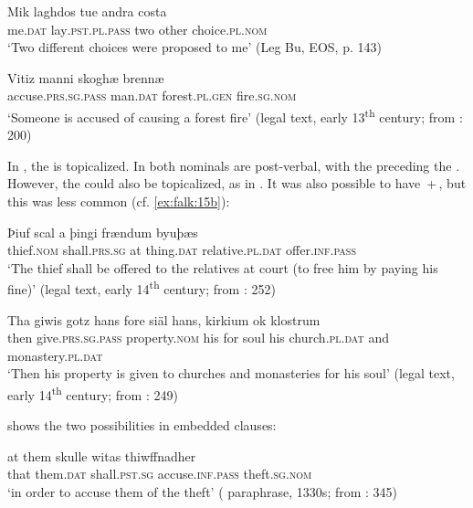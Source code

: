 \documentclass[output=paper]{langscibook}
\begin{document}
\ea%
    \label{ex:falk:14}
\ea \label{ex:falk:14a}
\gll Mik    laghdos        tue  andra  costa\\
      me\textsc{.dat}  lay\textsc{.pst.pl.pass}  two  other    choice\textsc{.pl.nom}\\
\glt ‘Two different choices were proposed to me’ (Leg Bu, EOS, p. 143)

\ex \label{ex:falk:14b}
\gll Vitiz              manni    skoghæ      brennæ\\
      accuse\textsc{.prs.sg.pass}  man\textsc{.dat}  forest.\textsc{pl.gen}  fire.\textsc{sg.nom}\\
\glt ‘Someone is accused of causing a forest fire’ (legal text, early 13\textsuperscript{th} century; from \citealt{Holm1952}: 200)
\z
\z

In , the  is topicalized. In  both nominals are post-verbal, with the  preceding the . However, the  could also be topicalized, as in . It was also possible to have \,+\,, but this was less common (cf. \ref{ex:falk:15b}):

\ea%
    \label{ex:falk:15}
\ea \label{ex:falk:15a}
\gll Þiuf      scal          a  þingi    frændum        byuþæs\\
      thief.\textsc{nom}  shall.\textsc{prs.sg}  at  thing.\textsc{dat}  relative.\textsc{pl}.\textsc{dat}  offer.\textsc{inf.pass}\\
\glt ‘The thief shall be offered to the relatives at court (to free him by paying his fine)’ (legal text, early 14\textsuperscript{th} century; from \citealt{Holm1952}\textsc{:} \textsc{252)}

\ex \label{ex:falk:15b}
\gll Tha  giwis          gotz        hans  fore  siäl  hans,  kirkium ok    klostrum\\
    then  give.\textsc{prs.sg.pass}  property.\textsc{nom}  his    for    soul  his    church.\textsc{pl.dat}   and  monastery.\textsc{pl.dat}\\
\glt ‘Then his property is given to churches and monasteries for his soul’ (legal text, early 14\textsuperscript{th} century; from \citealt{Holm1952}: 249)
\z
\z

          shows the two possibilities in embedded clauses:

\ea%
    \label{ex:falk:16}

\ea
\gll at    them    skulle        witas            thiwffnadher\\
      that  them.\textsc{dat}  shall.\textsc{pst.sg}  accuse.\textsc{inf.pass}    theft.\textsc{sg.nom}\\
\glt ‘in order to accuse them of the theft’ ( paraphrase, 1330s; from \citealt{Holm1952}: 345)
\end{document}
